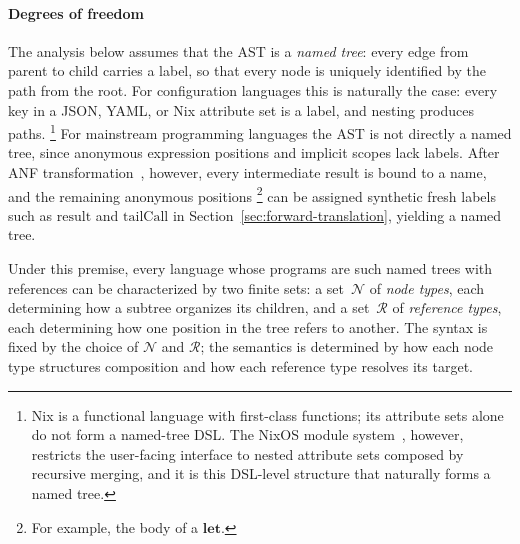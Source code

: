 \paragraph{Degrees of freedom}
The analysis below assumes that the AST is a \emph{named tree}:%
every edge from parent to child carries a label, so that every
node is uniquely identified by the path from the root.
For configuration languages this is naturally the case: every
key in a JSON, YAML, or Nix attribute set is a label, and nesting
produces paths.%
\footnote{
  Nix is a functional language with first-class functions;
  its attribute sets alone do not form a named-tree DSL.
  The NixOS module system~\cite{nixosmodules}, however,
  restricts the user-facing interface to nested attribute sets
  composed by recursive merging, and it is this DSL-level
  structure that naturally forms a named tree.
}
For mainstream programming languages the AST is not directly a
named tree, since anonymous expression positions and implicit
scopes lack labels.
After ANF
transformation~\cite{flanagan1993-essence-compiling-continuations}, however, every intermediate
result is bound to a name, and the remaining anonymous positions%
\footnote{
  For example, the body of a $\mathbf{let}$.
}
can be assigned synthetic
fresh labels such as $\mathrm{result}$ and $\mathrm{tailCall}$
in Section~\ref{sec:forward-translation}, yielding a named
tree.

Under this premise, every language whose programs are such
named trees with references can be characterized by two finite sets:
a set~$\mathcal{N}$ of \emph{node types}, each determining how a
subtree organizes its children, and a set~$\mathcal{R}$ of
\emph{reference types}, each determining how one position in the
tree refers to another.
The syntax is fixed by the choice of $\mathcal{N}$ and
$\mathcal{R}$; the semantics is determined by how each node type
structures composition and how each reference type resolves its
target.

